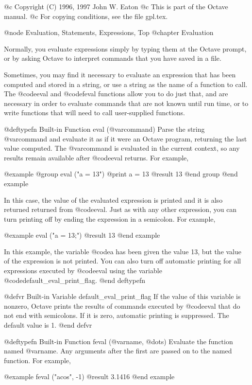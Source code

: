 @c Copyright (C) 1996, 1997 John W. Eaton
@c This is part of the Octave manual.
@c For copying conditions, see the file gpl.tex.

@node Evaluation, Statements, Expressions, Top
@chapter Evaluation

Normally, you evaluate expressions simply by typing them at the Octave
prompt, or by asking Octave to interpret commands that you have saved in
a file.

Sometimes, you may find it necessary to evaluate an expression that has
been computed and stored in a string, or use a string as the name of a
function to call.  The @code{eval} and @code{feval} functions allow you
to do just that, and are necessary in order to evaluate commands that
are not known until run time, or to write functions that will need to
call user-supplied functions.

@deftypefn {Built-in Function} {} eval (@var{command})
Parse the string @var{command} and evaluate it as if it were an Octave
program, returning the last value computed.  The @var{command} is
evaluated in the current context, so any results remain available after
@code{eval} returns.  For example,

@example
@group
eval ("a = 13")
     @print{} a = 13
     @result{} 13
@end group
@end example

In this case, the value of the evaluated expression is printed and it is
also returned returned from @code{eval}.  Just as with any other
expression, you can turn printing off by ending the expression in a
semicolon.  For example,

@example
eval ("a = 13;")
     @result{} 13
@end example

In this example, the variable @code{a} has been given the value 13, but
the value of the expression is not printed.  You can also turn off
automatic printing for all expressions executed by @code{eval} using the
variable @code{default_eval_print_flag}.
@end deftypefn

@defvr {Built-in Variable} default_eval_print_flag
If the value of this variable is nonzero, Octave prints the results of
commands executed by @code{eval} that do not end with semicolons.  If it
is zero, automatic printing is suppressed.  The default value is 1.
@end defvr

@deftypefn {Built-in Function} {} feval (@var{name}, @dots{})
Evaluate the function named @var{name}.  Any arguments after the first
are passed on to the named function.  For example,

@example
feval ("acos", -1)
     @result{} 3.1416
@end example

